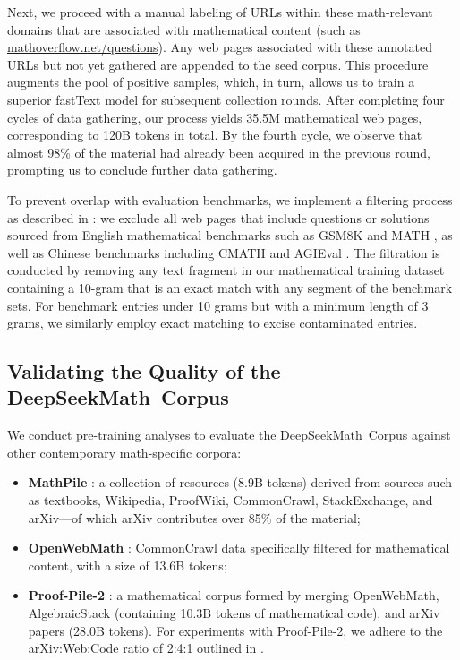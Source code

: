 Next, we proceed with a manual labeling of URLs within these math-relevant domains that are associated with mathematical content (such as \url{mathoverflow.net/questions}). Any web pages associated with these annotated URLs but not yet gathered are appended to the seed corpus. This procedure augments the pool of positive samples, which, in turn, allows us to train a superior fastText model for subsequent collection rounds. After completing four cycles of data gathering, our process yields 35.5M mathematical web pages, corresponding to 120B tokens in total. By the fourth cycle, we observe that almost 98\% of the material had already been acquired in the previous round, prompting us to conclude further data gathering.

To prevent overlap with evaluation benchmarks, we implement a filtering process as described in \cite{deepseek-coder}: we exclude all web pages that include questions or solutions sourced from English mathematical benchmarks such as GSM8K \citep{gsm8k} and MATH \citep{MATH}, as well as Chinese benchmarks including CMATH \citep{wei2023cmath} and AGIEval \citep{agieval}. The filtration is conducted by removing any text fragment in our mathematical training dataset containing a 10-gram that is an exact match with any segment of the benchmark sets. For benchmark entries under 10 grams but with a minimum length of 3 grams, we similarly employ exact matching to excise contaminated entries.

\subsection{Validating the Quality of the DeepSeekMath~Corpus}

We conduct pre-training analyses to evaluate the DeepSeekMath~Corpus against other contemporary math-specific corpora:

\begin{itemize}[topsep=0pt]
    \item \textbf{MathPile} \citep{mathpile}: a collection of resources (8.9B tokens) derived from sources such as textbooks, Wikipedia, ProofWiki, CommonCrawl, StackExchange, and arXiv—of which arXiv contributes over 85\% of the material;
    \item \textbf{OpenWebMath} \citep{openwebmath}: CommonCrawl data specifically filtered for mathematical content, with a size of 13.6B tokens;
    \item \textbf{Proof-Pile-2} \citep{llemma}: a mathematical corpus formed by merging OpenWebMath, AlgebraicStack (containing 10.3B tokens of mathematical code), and arXiv papers (28.0B tokens). For experiments with Proof-Pile-2, we adhere to the arXiv:Web:Code ratio of 2:4:1 outlined in \cite{llemma}.
\end{itemize}

